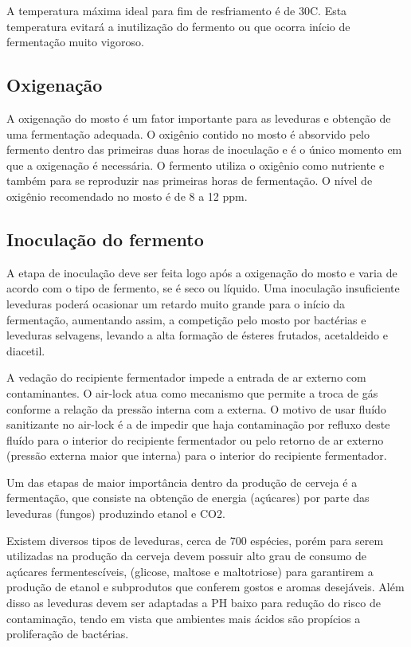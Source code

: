 A temperatura máxima ideal para fim de resfriamento é de 30\textdegree C. Esta temperatura evitará a inutilização do fermento ou que ocorra início de fermentação muito vigoroso.

\subsection{Oxigenação}
 A oxigenação do mosto é um fator importante para as leveduras e obtenção de uma fermentação adequada. O oxigênio contido no mosto é absorvido pelo fermento dentro das primeiras duas horas de inoculação e é o único momento em que a oxigenação é necessária. O fermento utiliza o oxigênio como nutriente e também para se reproduzir nas primeiras horas de fermentação. O nível de oxigênio recomendado no mosto é de 8 a 12 ppm.

 \subsection{Inoculação do fermento}
 
A etapa de inoculação deve ser feita logo após a oxigenação do mosto e varia de acordo com o tipo de fermento, se é seco ou líquido. Uma inoculação insuficiente leveduras poderá ocasionar um retardo muito grande para o início da fermentação, aumentando assim, a competição pelo mosto por bactérias e leveduras selvagens, levando a alta formação de ésteres frutados, acetaldeido e diacetil.
 
A vedação do recipiente fermentador impede a entrada de ar externo com contaminantes. O air-lock atua como mecanismo que permite a troca de gás conforme a relação da pressão interna com a externa. O motivo de usar fluído sanitizante no air-lock é a de impedir que haja contaminação por refluxo deste fluído para o interior do recipiente fermentador ou pelo retorno de ar externo (pressão externa maior que interna) para o interior do recipiente fermentador.

Um das etapas de maior importância dentro da produção de cerveja é a fermentação, que consiste na obtenção de energia (açúcares) por parte das leveduras (fungos) produzindo etanol e CO2.

Existem diversos tipos de leveduras, cerca de 700 espécies, porém para serem utilizadas na produção da cerveja devem possuir alto grau de consumo de açúcares fermentescíveis, (glicose, maltose e maltotriose) para garantirem a produção de etanol e subprodutos que conferem gostos e aromas desejáveis. Além disso as leveduras devem ser adaptadas a PH baixo para redução do risco de contaminação, tendo em vista que ambientes mais ácidos são propícios a proliferação de bactérias.

